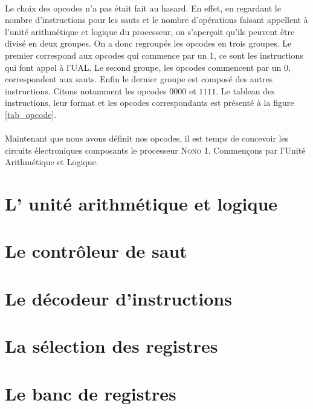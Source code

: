 \documentclass[a4paper]{article}
\begin{document}
			\paragraph{}{
			Le choix des opcodes n'a pas était fait au hasard. En effet, en regardant le nombre
			d'instructions pour les sauts et le nombre d'opérations faisant appellent à l'unité
			arithmétique et logique du processeur, on s’aperçoit qu'ils peuvent être divisé 
			en deux 	groupes. On a donc regroupés les opcodes en trois groupes. Le premier 
			correspond aux opcodes qui commence par un $1$, ce sont les instructions qui font 
			appel à l'UAL. Le second groupe, les opcodes commencent par un $0$, correspondent 
			aux sauts. Enfin le dernier groupe est composé des autres instructions. Citons
			notamment les opcodes $0000$ et $1111$. Le tableau des instructions, leur format et
			les opcodes correspondants est présenté à la figure \ref{tab_opcode}.
			}
			
			\paragraph{}{
			Maintenant que nous avons définit nos opcodes, il est temps de concevoir les circuits
			électroniques composants le processeur \textsc{Nono 1}. Commençons par l'Unité 
			Arithmétique et Logique.
			}
	
		\section{L' unité arithmétique et logique}
			
			
		\section{Le contrôleur de saut}
			
			
		\section{Le décodeur d'instructions}
			
			
		\section{La sélection des registres}
			
			
		\section{Le banc de registres}
			
			
\end{document}
